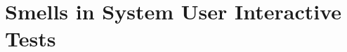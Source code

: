 \chapter{Smells in System User Interactive Tests}
\label{chap:smells-system-user-interactive-test}







